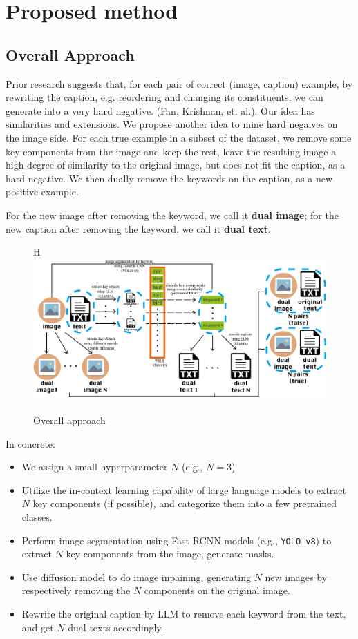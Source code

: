 \documentclass[11pt,letterpaper]{article}
\begin{document}
\section{Proposed method}
\subsection{Overall Approach}
Prior research suggests that, for each pair of correct (image, caption) example, by rewriting the caption, e.g. reordering and changing its constituents, we can generate into a very hard negative. (Fan, Krishnan, et. al.\cite{fan2023improvingcliptraininglanguage}). Our idea has similarities and extensions. We propose another idea to mine hard negaives on the image side. For each true example in a subset of the dataset, we remove some key components from the image and keep the rest, leave the resulting image a high degree of similarity to the original image, but does not fit the caption, as a hard negative. We then dually remove the keywords on the caption, as a new positive example.

For the new image after removing the keyword, we call it \textbf{dual image}; for the new caption after removing the keyword, we call it \textbf{dual text}. 

\begin{figure}{H}
    \centering
    \includegraphics[width=1\textwidth]{midterm_report/assets/pipeline2.png}
    \caption{Overall approach}
\end{figure}
In concrete: 
\begin{itemize}
    \item We assign a small hyperparameter $N$ (e.g., $N=3$)
    \item Utilize the in-context learning capability of large language models to extract $N$ key components (if possible), and categorize them into a few pretrained classes.
    \item Perform image segmentation using Fast RCNN models (e.g., \texttt{YOLO v8}) to extract $N$ key components from the image, generate masks.
    \item Use diffusion model to do image inpaining, generating $N$ new images by respectively removing the $N$ components on the original image.
    \item Rewrite the original caption by LLM to remove each keyword from the text, and get $N$ dual texts accordingly.
\end{itemize}
\end{document}
